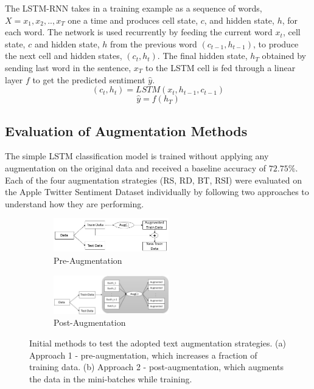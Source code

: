 \documentclass{article}
\begin{document}
The LSTM-RNN takes in a training example as a sequence of words, $X = {x_1, x_2, .., x_T}$ one a time and produces cell state, $c$, and hidden state, $h$, for each word. The network is used recurrently by feeding the current word $x_t$, cell state, $c$ and hidden state, $h$ from the previous word $(c_{t-1}, h_{t-1})$, to produce the next cell and hidden states, $(c_t, h_t)$. The final hidden state, $h_T$ obtained by sending last word in the sentence, $x_T$ to the LSTM cell is fed through a linear layer $f$ to get the predicted sentiment $\hat{y}$.
\begin{equation}
(c_t, h_t) = LSTM (x_t, h_{t-1}, c_{t-1}) 
\end{equation}
\begin{equation}
\hat{y} = f(h_T)
\end{equation}

\subsection{Evaluation of Augmentation Methods}
The simple LSTM classification model is trained without applying any augmentation on the original data and received a baseline accuracy of $72.75\%$. Each of the four augmentation strategies (RS, RD, BT, RSI) were evaluated on the Apple Twitter Sentiment Dataset individually by following two approaches to understand how they are performing. 

\begin{figure}
  \begin{subfigure}{6cm}
    \centering\includegraphics[width=5cm]{approach1.jpg}
    \caption{Pre-Augmentation}
  \end{subfigure}
  \begin{subfigure}{6cm}
    \centering\includegraphics[width=5cm]{approach2.jpg}
    \caption{Post-Augmentation}
  \end{subfigure}
  \caption{Initial methods to test the adopted text augmentation strategies. (a) Approach 1 - pre-augmentation, which increases a fraction of training data. (b) Approach 2 - post-augmentation, which augments the data in the mini-batches while training.}
  \label{fig:initialmethods}
\end{figure}
\end{document}
